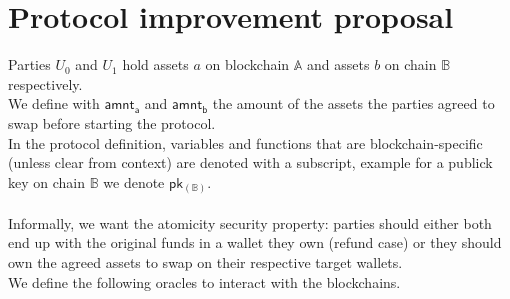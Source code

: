 \documentclass{article}      	%
\begin{document}
%
\section{Protocol improvement proposal}
Parties $U_0$ and $U_1$ hold assets $a$ on blockchain $\mathbb{A}$ and assets $b$ on chain $\mathbb{B}$ respectively. \\
We define with $\mathsf{amnt_a}$ and $\mathsf{amnt_b}$ the amount of the assets the parties agreed to swap before starting the protocol. \\
In the protocol definition, variables and functions that are blockchain-specific (unless clear from context) are denoted with a subscript, example for a publick key on chain $\mathbb{B}$ we denote $\mathsf{pk_{(\mathbb{B})}}$. \\
\\

Informally, we want the atomicity security property: parties should either both end up with the original funds in a wallet they own (refund case) or they should own the agreed assets to swap on their respective target wallets. \\

We define the following oracles to interact with the blockchains.
\end{document}
